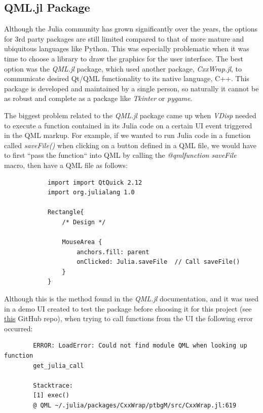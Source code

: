 \documentclass[11pt,fleqn]{article}
\newcommand{\indentpar}{\phantom{=}}
\begin{document}
    \subsection*{QML.jl Package}
        \indentpar Although the Julia community has grown significantly
        over the years, the options for 3rd party packages are still limited
        compared to that of more mature and ubiquitous languages like Python.
        This was especially problematic when it was time to choose a library 
        to draw the graphics for the user interface. The best option was the 
        \emph{QML.jl} package, which used another package, \emph{CxxWrap.jl},
        to communicate desired Qt/QML functionality to its native language, C++.
        This package is developed and maintained by a single person, so naturally
        it cannot be as robust and complete as a package like \emph{Tkinter} or 
        \emph{pygame}.

        \indentpar The biggest problem related to the \emph{QML.jl} package came up
        when \emph{VDisp} needed to execute a function contained in its Julia code on 
        a certain UI event triggered in the QML markup. For example, if we wanted to run 
        Julia code in a function called \emph{saveFile()} when clicking on a button defined
        in a QML file, we would have to first “pass the function“ into QML by calling the 
        \emph{@qmlfunction saveFile} macro, then have a QML file as follows:

        \begin{verbatim}
            import import QtQuick 2.12
            import org.julialang 1.0

            Rectangle{
                /* Design */
                
                MouseArea {
                    anchors.fill: parent
                    onClicked: Julia.saveFile  // Call saveFile()
                }
            }
        \end{verbatim}
        
        \indentpar Although this is the method found in the \emph{QML.jl} documentation,
        and it was used in a demo UI created to test the package before choosing it
        for this project (see \href{https://github.com/EmilSoleymani/JuliaThermostat}{this} 
        GitHub repo), when trying to call functions from the UI the following error 
        occurred:
        
        \begin{center}
        \begin{BVerbatim}
        ERROR: LoadError: Could not find module QML when looking up function 
        get_julia_call
        
        Stacktrace:
        [1] exec()
        @ QML ~/.julia/packages/CxxWrap/ptbgM/src/CxxWrap.jl:619
        \end{BVerbatim}
        \end{center}
\end{document}

